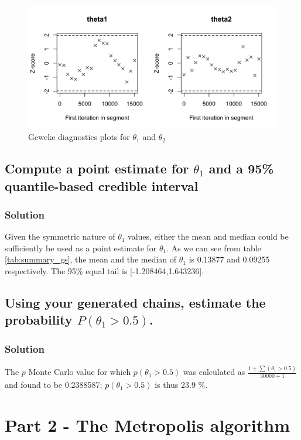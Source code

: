 \documentclass[12pt]{article}
\begin{document}
\begin{figure}[h!]
    \centering
    \includegraphics[width=0.6\linewidth]{pictures/fig05-gs-geweke.png}
    \caption{Geweke diagnostics plots for  $\theta_1$ and $\theta_2$ }
    \label{fig:gs-geweke}
\end{figure}


\subsection{Compute a point estimate for $\theta_1$ and a 95\% quantile-based credible interval}
\subsubsection{Solution}
Given the symmetric nature of $\theta_1$ values, either the mean and median could be sufficiently be used as a point estimate for $\theta_1$. As we can see from table \ref{tab:summary_gs}, the mean and the median of $\theta_1$ is 0.13877 and 0.09255 respectively. The 95\% equal tail is [-1.208464,1.643236].


\subsection{Using your generated chains, estimate the probability $P(\theta_1 > 0.5)$.}
\subsubsection{Solution}
The $p$ Monte Carlo value for which $p(\theta_1 > 0.5)$ was calculated as  $\frac{1 + \sum (\theta_1 > 0.5)}{30000 + 1}$ and found to be 0.2388587; $p(\theta_1 > 0.5)$ is thus 23.9 \%.


\section{Part 2 - The Metropolis algorithm}
\end{document}
